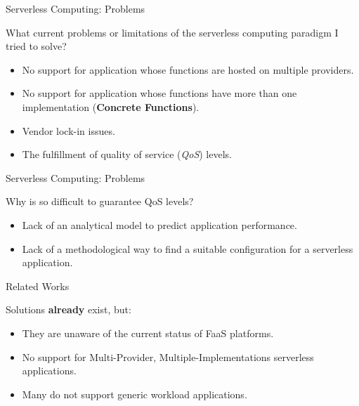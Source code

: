 \documentclass[13.5pt]{beamer}
\newcommand{\B}[1]{\textcolor{TorVergataColor}{\textbf{#1}}}
\begin{document}
\begin{frame}{Serverless Computing: Problems}
	
	\begin{block}{}
		\centering
		What current problems or limitations of the serverless computing paradigm I tried to solve?
	\end{block}
\vspace{\baselineskip}
	\begin{itemize}
		\item No support for application whose functions are hosted on multiple providers.
		\item No support for application whose functions have more than one implementation (\B{Concrete Functions}).
		\item Vendor lock-in issues.
		\item The fulfillment of quality of service (\textit{QoS}) levels.
	\end{itemize}

\end{frame} 
\begin{frame}{Serverless Computing: Problems}
	
	\begin{block}{}
		\centering
		Why is so difficult to guarantee QoS levels?
	\end{block}
	\vspace{\baselineskip}
	\begin{itemize}
		\item Lack of an analytical model to predict application performance.
		\vspace{\baselineskip}
		\item Lack of a methodological way to find a suitable configuration for a serverless application.
	\end{itemize}

\end{frame} 

\begin{frame}{Related Works}

Solutions \B{already} exist, but:
\vspace{\baselineskip}
\begin{itemize}
	\item They are unaware of the current status of FaaS platforms.
	\item No support for Multi-Provider, Multiple-Implementations serverless applications. 
	\item Many do not support generic workload applications.
\end{itemize}

\end{frame} 
\end{document}
